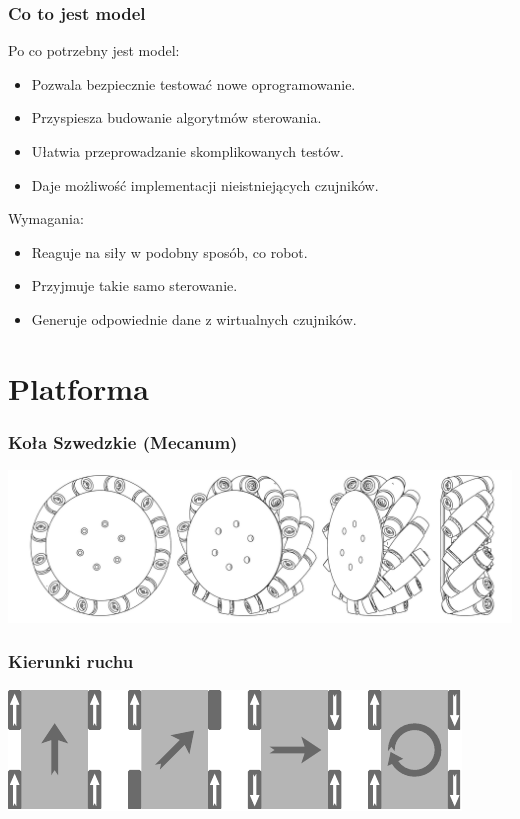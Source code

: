 \documentclass{beamer}
\begin{document}
	\begin{frame}
		\frametitle{Co to jest model}
		Po co potrzebny jest model:
		\begin{itemize}
		 \item Pozwala bezpiecznie testować nowe oprogramowanie.
		 \item Przyspiesza budowanie algorytmów sterowania.
		 \item Ułatwia przeprowadzanie skomplikowanych testów.
		 \item Daje możliwość implementacji nieistniejących czujników.
		\end{itemize}
		Wymagania:
		\begin{itemize}
		 \item Reaguje na siły w podobny sposób, co robot.
		 \item Przyjmuje takie samo sterowanie.
		 \item Generuje odpowiednie dane z wirtualnych czujników.
		\end{itemize}
	\end{frame}
	
	\section{Platforma}
	\begin{frame}
		\frametitle{Koła Szwedzkie (Mecanum)}
		\includegraphics[width=\textwidth]{graphics/wheel.pdf}
	\end{frame}
	\begin{frame}
		\frametitle{Kierunki ruchu}
		\includegraphics[width=\textwidth]{graphics/dirs.pdf}
	\end{frame}


	
	
	
\end{document}
